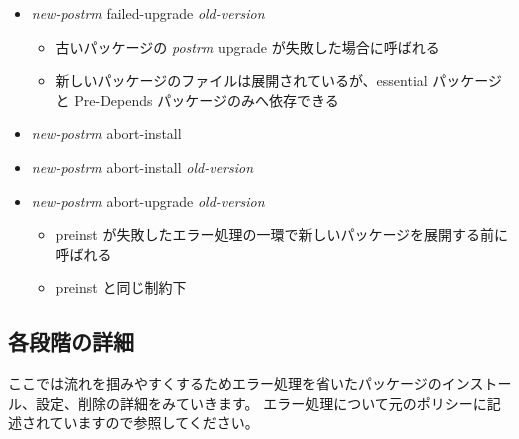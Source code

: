 \documentclass[mingoth,a4paper]{jsarticle}
\begin{document}
\begin{itemize}
\item {\it new-postrm} failed-upgrade {\it old-version}
  \begin{itemize}
  \item 古いパッケージの {\it postrm} upgrade が失敗した場合に呼ばれる
  \item 新しいパッケージのファイルは展開されているが、essential パッケージと Pre-Depends パッケージのみへ依存できる
  \end{itemize}
\end{itemize}

\begin{itemize}
\item {\it new-postrm} abort-install
\item {\it new-postrm} abort-install {\it old-version}
\item {\it new-postrm} abort-upgrade {\it old-version}
  \begin{itemize}
  \item preinst が失敗したエラー処理の一環で新しいパッケージを展開する前に呼ばれる
  \item preinst と同じ制約下
  \end{itemize}
\end{itemize}



\subsection{各段階の詳細}
ここでは流れを掴みやすくするためエラー処理を省いたパッケージのインストール、設定、削除の詳細をみていきます。
エラー処理について元のポリシーに記述されていますので参照してください。
\end{document}
